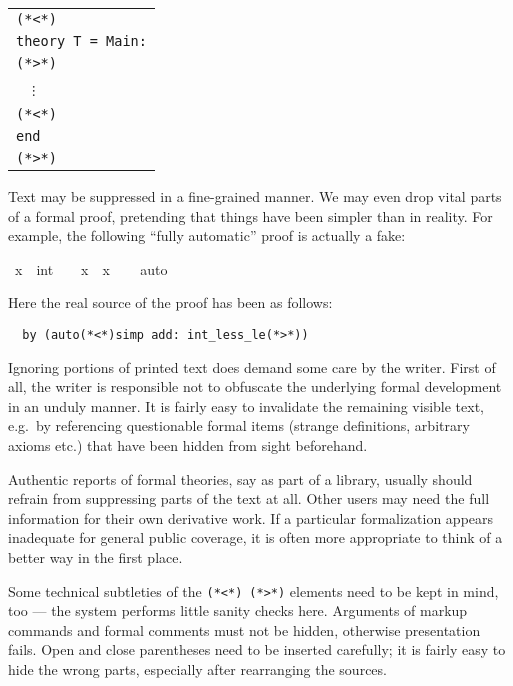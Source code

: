 \begin{isabellebody}
\begin{isamarkuptext}
  \medskip

  \begin{tabular}{l}
  \verb,(,\verb,*,\verb,<,\verb,*,\verb,), \\
  \texttt{theory T = Main:} \\
  \verb,(,\verb,*,\verb,>,\verb,*,\verb,), \\
  ~~$\vdots$ \\
  \verb,(,\verb,*,\verb,<,\verb,*,\verb,), \\
  \texttt{end} \\
  \verb,(,\verb,*,\verb,>,\verb,*,\verb,), \\
  \end{tabular}

  \medskip

  Text may be suppressed in a fine-grained manner.  We may even drop
  vital parts of a formal proof, pretending that things have been
  simpler than in reality.  For example, the following ``fully
  automatic'' proof is actually a fake:%
\end{isamarkuptext}%
\isamarkuptrue%
\ {\isachardoublequote}x\ {\isasymnoteq}\ {\isacharparenleft}{}{\isacharcolon}{\isacharcolon}int{\isacharparenright}\ {\isasymLongrightarrow}\ {}\ {\isacharless}\ x\ {\isacharasterisk}\ x{\isachardoublequote}\isanewline
\ \ \isamarkupfalse%
\ {\isacharparenleft}auto{\isacharparenright}\isamarkupfalse%
%
\begin{isamarkuptext}%
\noindent Here the real source of the proof has been as follows:

\begin{verbatim}
  by (auto(*<*)simp add: int_less_le(*>*))
\end{verbatim}

  \medskip Ignoring portions of printed text does demand some care by
  the writer.  First of all, the writer is responsible not to
  obfuscate the underlying formal development in an unduly manner.  It
  is fairly easy to invalidate the remaining visible text, e.g.\ by
  referencing questionable formal items (strange definitions,
  arbitrary axioms etc.) that have been hidden from sight beforehand.

  Authentic reports of formal theories, say as part of a library,
  usually should refrain from suppressing parts of the text at all.
  Other users may need the full information for their own derivative
  work.  If a particular formalization appears inadequate for general
  public coverage, it is often more appropriate to think of a better
  way in the first place.

  \medskip Some technical subtleties of the
  \verb,(,\verb,*,\verb,<,\verb,*,\verb,),~\verb,(,\verb,*,\verb,>,\verb,*,\verb,),
  elements need to be kept in mind, too --- the system performs little
  sanity checks here.  Arguments of markup commands and formal
  comments must not be hidden, otherwise presentation fails.  Open and
  close parentheses need to be inserted carefully; it is fairly easy
  to hide the wrong parts, especially after rearranging the sources.%
\end{isamarkuptext}%
\isamarkuptrue%
\isamarkupfalse%
\end{isabellebody}%

